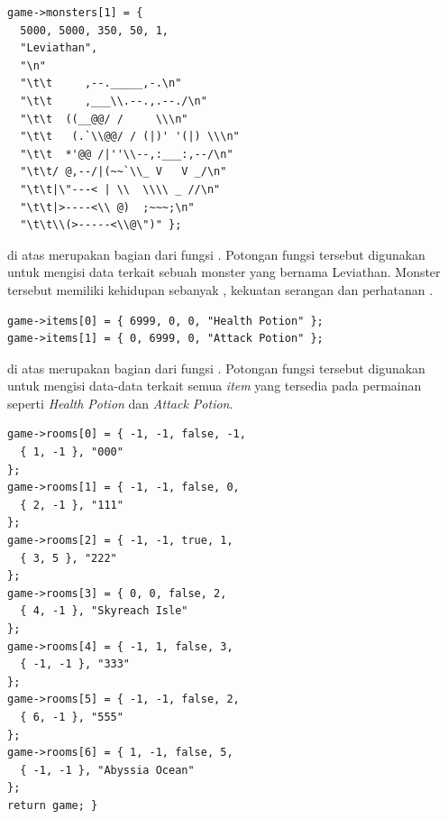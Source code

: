 \documentclass[../main.tex]{subfiles}
\begin{document}
\begin{code}
\begin{verbatim}
game->monsters[1] = {
  5000, 5000, 350, 50, 1,
  "Leviathan",
  "\n"
  "\t\t     ,--._____,-.\n"
  "\t\t     ,___\\.--.,.--./\n"
  "\t\t  ((__@@/ /     \\\n"
  "\t\t   (.`\\@@/ / (|)' '(|) \\\n"
  "\t\t  *'@@ /|''\\--,:___:,--/\n"
  "\t\t/ @,--/|(~~`\\_ V   V _/\n"
  "\t\t|\"---< | \\  \\\\ _ //\n"
  "\t\t|>----<\\ @)  ;~~~;\n"
  "\t\t\\(>-----<\\@\")" };
\end{verbatim}
\end{code}

{\Script} di atas merupakan bagian dari fungsi . Potongan fungsi tersebut digunakan untuk mengisi data terkait sebuah monster yang bernama Leviathan. Monster tersebut memiliki kehidupan sebanyak , kekuatan serangan  dan perhatanan .

\begin{code}
\begin{verbatim}
game->items[0] = { 6999, 0, 0, "Health Potion" };
game->items[1] = { 0, 6999, 0, "Attack Potion" };
\end{verbatim}
\end{code}

{\Script} di atas merupakan bagian dari fungsi . Potongan fungsi tersebut digunakan untuk mengisi data-data terkait semua \textit{item} yang tersedia pada permainan seperti \textit{Health Potion} dan \textit{Attack Potion}.

\begin{code}
\begin{verbatim}
game->rooms[0] = { -1, -1, false, -1,     
  { 1, -1 }, "000"
};
game->rooms[1] = { -1, -1, false, 0,    
  { 2, -1 }, "111"
};
game->rooms[2] = { -1, -1, true, 1,     
  { 3, 5 }, "222"
};
game->rooms[3] = { 0, 0, false, 2,    
  { 4, -1 }, "Skyreach Isle"
};
game->rooms[4] = { -1, 1, false, 3,     
  { -1, -1 }, "333"
};
game->rooms[5] = { -1, -1, false, 2,    
  { 6, -1 }, "555"
};
game->rooms[6] = { 1, -1, false, 5,     
  { -1, -1 }, "Abyssia Ocean"
};
return game; }
\end{verbatim}
\end{code}
\end{document}
